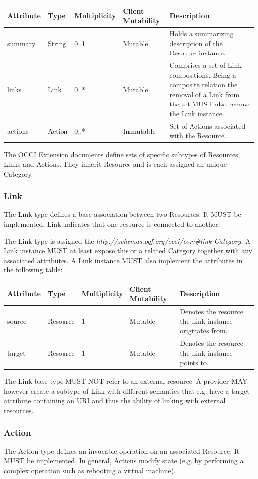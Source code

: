 \documentclass[10pt,a4paper,british]{article}
\begin{document}
\begin{tabular}{l|l|l|l|p{2.7in}}
Attribute & Type & Multiplicity & Client Mutability & Description \\
\hline
summary & String & 0..1 & Mutable & Holds a summarizing description of the Resource instance.\\
links & Link & 0..* & Mutable & Comprises a set of Link compositions. Being a composite relation the removal of a Link from the set MUST also remove the Link instance.\\
actions & Action & 0..* & Immutable & Set of Actions associated with the Resource.\\
\end{tabular}

The OCCI Extension documents define sets of specific subtypes of
Resources, Links and Actions. They inherit Resource and is each
assigned an unique Category.

\subsubsection{Link}
The Link type defines a base association between two Resources. It
MUST be implemented. Link indicates that one resource is connected to
another.

The Link type is assigned the
\textit{http://schemas.ogf.org/occi/core\#link Category}. A Link
instance MUST at least expose this or a related Category together with
any associated attributes. A Link instance MUST also implement the
attributes in the following table:

\begin{tabular}{l|l|l|l|p{2.7in}}
Attribute & Type & Multiplicity & Client Mutability & Description \\
\hline
source & Resource & 1 & Mutable & Denotes the resource the Link instance originates from.\\
target & Resource & 1 & Mutable & Denotes the resource the Link instance points to.\\
\end{tabular}

The Link base type MUST NOT refer to an external resource. A provider
MAY however create a subtype of Link with different semantics that
e.g. have a target attribute containing an URI and thus the ability of
linking with external resources.

\subsubsection{Action}
The Action type defines an invocable operation on an associated
Resource. It MUST be implemented. In general, Actions modify state
(e.g. by performing a complex operation such as rebooting a virtual
machine).
\end{document}

